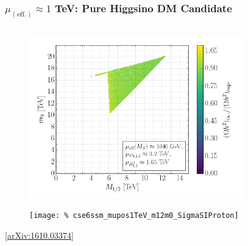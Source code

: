 \documentclass[10pt,aspectratio=169]{beamer}
\begin{document}
\begin{frame}
  \frametitle{$\mu_{(\text{eff.})} \approx 1$ TeV: Pure Higgsino DM
    Candidate}
    \begin{columns}[t]
    \begin{column}{0.3\textwidth}
      \vspace{-35pt}
      \begin{figure}
        \includegraphics[width=1.1\textwidth]{cse6ssm_mupos1TeV_m12m0_Omega}
      \end{figure}
      \vspace{-30pt}
      \begin{figure}
        \texttt{[image: \%
          cse6ssm\_mupos1TeV\_m12m0\_SigmaSIProton]}
      \end{figure}
      \vspace{-20pt}
      \begin{center}
        \tiny [\href{https://arxiv.org/abs/1610.03374}{arXiv:1610.03374}]
      \end{center}
    \end{column}
    \begin{column}{0.7\textwidth}
      \begin{columns}[t]
        \begin{column}{0.5\textwidth}
          \vspace{-47pt}
          \begin{figure}
            \hspace*{20pt}

\end{figure}
\end{column}
\end{columns}
\end{column}
\end{columns}
\end{frame}
\end{document}
